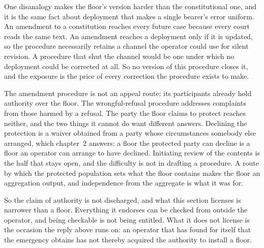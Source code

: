 One disanalogy makes the floor's version harder than the constitutional one, and it is the same fact about deployment that makes a single bearer's error uniform. An amendment to a constitution reaches every future case because every court reads the same text. An amendment reaches a deployment only if it is updated, so the procedure necessarily retains a channel the operator could use for silent revision. A procedure that shut the channel would be one under which no deployment could be corrected at all. So no version of this procedure closes it, and the exposure is the price of every correction the procedure exists to make.

The amendment procedure is not an appeal route: its participants already hold authority over the floor. The wrongful-refusal procedure addresses complaints from those harmed by a refusal. The party the floor claims to protect reaches neither, and the two things it cannot do want different answers. Declining the protection is a waiver obtained from a party whose circumstances somebody else arranged, which chapter~2 answers: a floor the protected party can decline is a floor an operator can arrange to have declined. Initiating review of the contents is the half that stays open, and the difficulty is not in drafting a procedure. A route by which the protected population sets what the floor contains makes the floor an aggregation output, and independence from the aggregate is what it was for.

So the claim of authority is not discharged, and what this section licenses is narrower than a floor. Everything it endorses can be checked from outside the operator, and being checkable is not being entitled. What it does not license is the occasion the reply above runs on: an operator that has found for itself that the emergency obtains has not thereby acquired the authority to install a floor.

